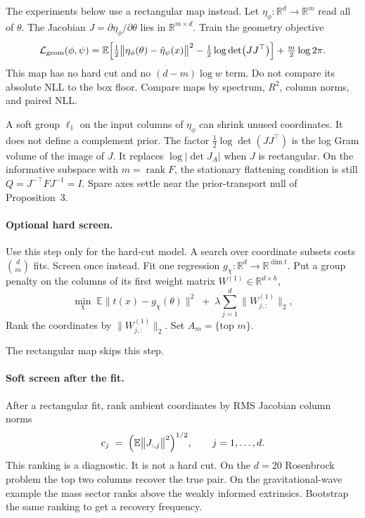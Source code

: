 \documentclass[11pt, letterpaper]{article}
\theoremstyle{definition}
\begin{document}
The experiments below use a rectangular map instead.
Let $\eta_\phi:\mathbb{R}^d\to\mathbb{R}^m$ read all of $\theta$.
The Jacobian $J=\partial\eta_\phi/\partial\theta$ lies in
$\mathbb{R}^{m\times d}$.
Train the geometry objective
\begin{equation}
  \mathcal{L}_{\mathrm{geom}}(\phi,\psi)
  = \mathbb{E}\Bigl[\tfrac12\bigl\|\eta_\phi(\theta)-\hat\eta_\psi(x)\bigr\|^2
    - \tfrac12\log\det\bigl(JJ^\top\bigr)\Bigr]
    + \tfrac{m}{2}\log 2\pi .
  \label{eq:geom}
\end{equation}
This map has no hard cut and no $(d-m)\log w$ term.
Do not compare its absolute NLL to the box floor.
Compare maps by spectrum, $R^2$, column norms, and paired NLL.

A soft group $\ell_1$ on the input columns of $\eta_\phi$ can shrink unused
coordinates. It does not define a complement prior.
The factor $\tfrac12\log\det(JJ^\top)$ is the log Gram volume of the image of
$J$. It replaces $\log|\det J_A|$ when $J$ is rectangular.
On the informative subspace with $m=\operatorname{rank}F$, the stationary
flattening condition is still $Q=J^{-\top}FJ^{-1}=I$.
Spare axes settle near the prior-transport null of Proposition~3.

\paragraph{Optional hard screen.}
Use this step only for the hard-cut model.
A search over coordinate subsets costs $\binom dm$ fits.
Screen once instead.
Fit one regression $g_\chi:\mathbb{R}^d\to\mathbb{R}^{\dim t}$.
Put a group penalty on the columns of its first weight matrix
$W^{(1)}\in\mathbb{R}^{d\times h}$,
\begin{equation}
  \min_\chi\;\mathbb{E}\bigl\|t(x)-g_\chi(\theta)\bigr\|^2
  \;+\;\lambda\sum_{j=1}^{d}\bigl\|W^{(1)}_{j,:}\bigr\|_2 ,
  \label{eq:screen}
\end{equation}
Rank the coordinates by $\|W^{(1)}_{j,:}\|_2$.
Set $A_m=\{\text{top }m\}$.

The rectangular map skips this step.

\paragraph{Soft screen after the fit.}
After a rectangular fit, rank ambient coordinates by RMS Jacobian column norms
\begin{equation}
  c_j \;=\; \Bigl(\mathbb{E}\bigl\|J_{:,j}\bigr\|^2\Bigr)^{1/2},\qquad
  j=1,\dots,d .
  \label{eq:softscreen}
\end{equation}
This ranking is a diagnostic. It is not a hard cut.
On the $d=20$ Rosenbrock problem the top two columns recover the true pair.
On the gravitational-wave example the mass sector ranks above the weakly
informed extrinsics. Bootstrap the same ranking to get a recovery frequency.
\end{document}
